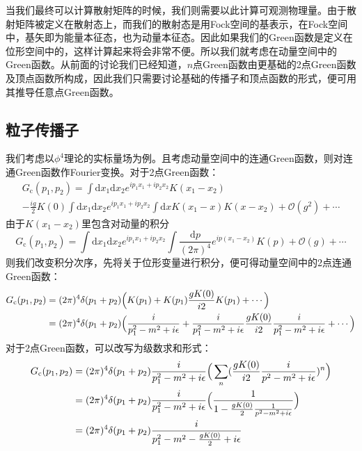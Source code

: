 当我们最终可以计算散射矩阵的时候，我们则需要以此计算可观测物理量。由于散射矩阵被定义在散射态上，而我们的散射态是用Fock空间的基表示，在Fock空间中，基矢即为能量本征态，也为动量本征态。因此如果我们的Green函数是定义在位形空间中的，这样计算起来将会非常不便。所以我们就考虑在动量空间中的Green函数。从前面的讨论我们已经知道，$n$点Green函数由更基础的2点Green函数及顶点函数所构成，因此我们只需要讨论基础的传播子和顶点函数的形式，便可用其推导任意点Green函数。



\subsection{粒子传播子}
我们考虑以$\phi^4$理论的实标量场为例。且考虑动量空间中的连通Green函数，则对连通Green函数作Fourier变换。对于2点Green函数：
\begin{multline}
G_{\text{c}}(p_1,p_2)=\int\mathrm{d}x_1\mathrm{d}x_2 e^{ip_1x_1+ip_2x_2}K(x_1-x_2)\\
-\frac{ig}{2}K(0)\int\mathrm{d}x_1\mathrm{d}x_2 e^{ip_1x_1+ip_2x_2}\int\mathrm{d}x K(x_1-x)K(x-x_2)+\mathcal{O}(g^2)+\cdots
\end{multline}
由于$K(x_1-x_2)$里包含对动量的积分
\begin{equation}
G_{\text{c}}(p_1,p_2)=\int\mathrm{d}x_1\mathrm{d}x_2 e^{ip_1x_1+ip_2x_2}\int\frac{\mathrm{d}p}{(2\pi)^4}e^{ip(x_1-x_2)}K(p)+\mathcal{O}(g)+\cdots
\end{equation}
则我们改变积分次序，先将关于位形变量进行积分，便可得动量空间中的2点连通Green函数：
	\begin{align}
	G_{\text{c}}(p_1,p_2)&=(2\pi)^4\delta(p_1+p_2)\Big(K(p_1)+K(p_1)\frac{gK(0)}{i2}K(p_1)+\cdots\Big)\notag\\
	&=(2\pi)^4\delta(p_1+p_2)\Big(\frac{i}{p_1^2-m^2+i\epsilon}+\frac{i}{p_1^2-m^2+i\epsilon}\frac{gK(0)}{i2}\frac{i}{p_1^2-m^2+i\epsilon}+\cdots	\Big)
	\end{align}
对于2点Green函数，可以改写为级数求和形式：
\begin{align}
G_{\text{c}}(p_1,p_2)&=(2\pi)^4\delta(p_1+p_2)\frac{i}{p_1^2-m^2+i\epsilon}\Big(\sum_{n}(\frac{gK(0)}{i2}\frac{i}{p^2-m^2+i\epsilon})^n\Big)\notag\\
&=(2\pi)^4\delta(p_1+p_2)\frac{i}{p_1^2-m^2+i\epsilon}\Big(\frac{1}{1-\frac{gK(0)}{2}\frac{1}{p^2-m^2+i\epsilon}}\Big)\notag\\
&=(2\pi)^4\delta(p_1+p_2)\frac{i}{p_1^2-m^2-\frac{gK(0)}{2}+i\epsilon}
\end{align}
